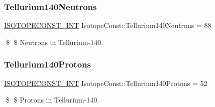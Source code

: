 \subsubsection{\texorpdfstring{Tellurium140\+Neutrons}{Tellurium140Neutrons}}
{\footnotesize\ttfamily \mbox{\hyperlink{group___isotope_const-_macros_ga5f18360b3e99483a35c32d789e62621c}{I\+S\+O\+T\+O\+P\+E\+C\+O\+N\+S\+T\+\_\+\+I\+NT}} Isotope\+Const\+::\+Tellurium140\+Neutrons = 88}

\$ \$ Neutrons in Tellurium-\/140. \mbox{\label{group___isotope_const-_tellurium-_te140_ga7d79307fdd3d4e9f5d24e4441d3e8c74}} 
\subsubsection{\texorpdfstring{Tellurium140\+Protons}{Tellurium140Protons}}
{\footnotesize\ttfamily \mbox{\hyperlink{group___isotope_const-_macros_ga5f18360b3e99483a35c32d789e62621c}{I\+S\+O\+T\+O\+P\+E\+C\+O\+N\+S\+T\+\_\+\+I\+NT}} Isotope\+Const\+::\+Tellurium140\+Protons = 52}

\$ \$ Protons in Tellurium-\/140. 
